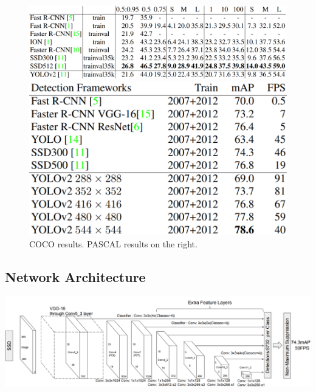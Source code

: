 \documentclass{article}
\begin{document}
 \begin{figure}[htbp]
    \centering
    \begin{minipage}{0.63\textwidth}
        \centering
        \includegraphics[width=1\textwidth]{yolo2coco.PNG} %
        \caption{COCO results. PASCAL results on the right.}
    \end{minipage}\hfill
    \begin{minipage}{0.35\textwidth}
        \centering
        \includegraphics[width=1\textwidth]{yolo2pascal.PNG} %
    \end{minipage}
\end{figure}
 
\subsection{Network Architecture}

\begin{center}
\includegraphics[scale=0.42]{ssdonly.PNG}
\end{center}
\end{document}
